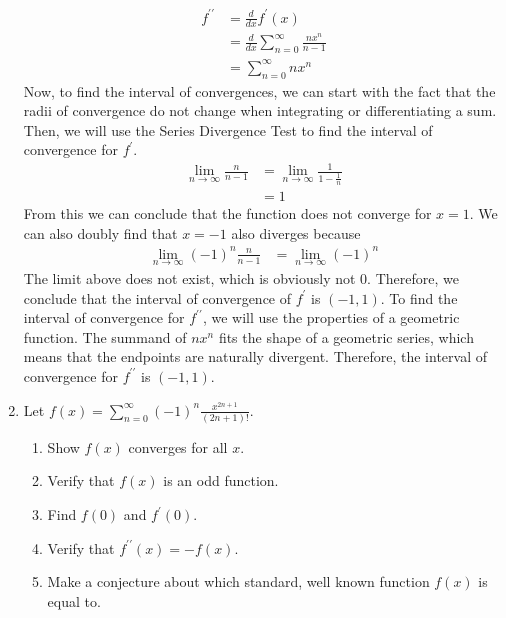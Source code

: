 \documentclass{article}
\begin{document}
\begin{enumerate}[label=\textbf{(14.\arabic*)}]
\begin{align*}
f^{\prime\prime} &= \frac{d}{dx}f^\prime(x)\\
&= \frac{d}{dx} \sum_{n=0}^\infty \frac{nx^n}{n-1}\\
&= \sum_{n=0}^\infty nx^n
\end{align*}
Now, to find the interval of convergences, we can start with the fact that the radii of convergence do not change when integrating or differentiating a sum. Then, we will use the Series Divergence Test to find the interval of convergence for $f^\prime$. 
\begin{align*}
\lim_{n\to\infty} \frac{n}{n-1} &= \lim_{n\to\infty} \frac{1}{1-\frac{1}{n}}\\
&= 1
\end{align*}
From this we can conclude that the function does not converge for $x=1$. We can also doubly find that $x=-1$ also diverges because
\begin{align*}
\lim_{n\to\infty} (-1)^n\frac{n}{n-1} &= \lim_{n\to\infty} (-1)^n
\end{align*}
The limit above does not exist, which is obviously not 0. Therefore, we conclude that the interval of convergence of $f^\prime$ is $(-1,1)$. To find the interval of convergence for $f^{\prime\prime}$, we will use the properties of a geometric function. The summand of $nx^n$ fits the shape of a geometric series, which means that the endpoints are naturally divergent. Therefore, the interval of convergence for $f^{\prime\prime}$ is $(-1,1)$.

\newpage

\item Let $\displaystyle f(x) = \sum_{n=0}^\infty (-1)^n\frac{x^{2n+1}}{(2n+1)!}$.
\begin{enumerate}
    \item Show $f(x)$ converges for all $x$.
    \item Verify that $f(x)$ is an odd function.
    \item Find $f(0)$ and $f^\prime(0)$.
    \item Verify that $f^{\prime\prime}(x)=-f(x)$.
    \item Make a conjecture about which standard, well known function $f(x)$ is equal to.
\end{enumerate}


\end{enumerate}
\end{document}
